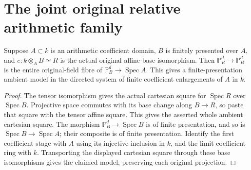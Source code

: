 \section{The joint original relative arithmetic family}

\begin{lemma}
\label{lem:kn-relative-arithmetic-fixed-projective-ambient}
\leanok
Suppose $A\subset k$ is an arithmetic coefficient domain, $B$ is
finitely presented over $A$, and $e:k\otimes_A B\simeq R$ is the
actual original affine-base isomorphism.  Then
$\mathbb P_R^d\to\mathbb P_B^d$ is the entire original-field fibre
of $\mathbb P_B^d\to\operatorname{Spec}A$.  This gives a
finite-presentation ambient model in the directed system of finite
coefficient enlargements of $A$ in $k$.
\end{lemma}
\begin{proof}
The tensor isomorphism gives the actual cartesian square for
$\operatorname{Spec}R$ over $\operatorname{Spec}B$.  Projective
space commutes with its base change along $B\to R$, so paste that
square with the tensor affine square.  This gives the asserted
whole ambient cartesian square.  The morphism
$\mathbb P_B^d\to\operatorname{Spec}B$ is of finite presentation,
and so is $\operatorname{Spec}B\to\operatorname{Spec}A$; their
composite is of finite presentation.  Identify the first coefficient
stage with $A$ using its injective inclusion in $k$, and the limit
coefficient ring with $k$.  Transporting the displayed cartesian
square through these base isomorphisms gives the claimed model,
preserving each original projection.
\end{proof}
